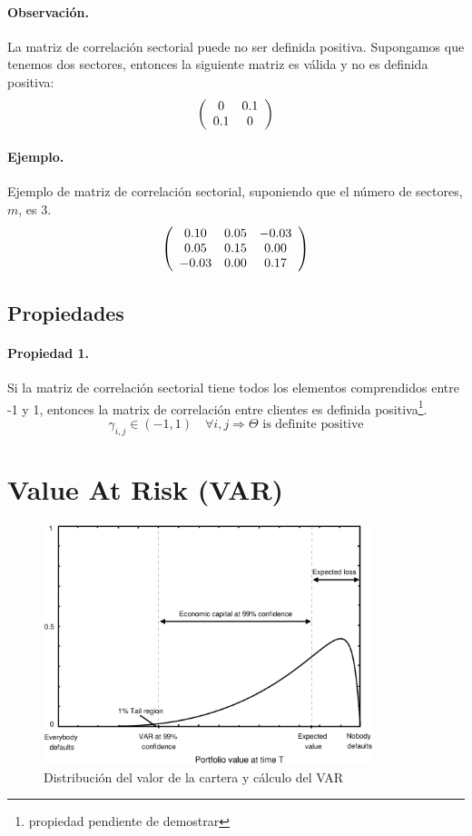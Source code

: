 \paragraph{Observaci\'on.} La matriz de correlaci\'on sectorial puede no ser 
definida positiva. Supongamos que tenemos dos sectores, entonces la siguiente 
matriz es v\'alida y no es definida positiva:
\begin{displaymath}
\left(
\begin{array}{cc}
0 & 0.1 \cr
0.1 & 0
\end{array}
\right)
\end{displaymath}

\paragraph{Ejemplo.} Ejemplo de matriz de correlaci\'on sectorial, suponiendo 
que el n\'umero de sectores, $m$, es 3.
\begin{displaymath}
\left(
\begin{array}{ccc}
 0.10 &  0.05 & -0.03 \cr
 0.05 &  0.15 &  0.00 \cr
-0.03 &  0.00 &  0.17
\end{array}
\right)
\end{displaymath}

\subsection{Propiedades} 

\paragraph{Propiedad 1.} Si la matriz de correlaci\'on sectorial tiene 
todos los elementos comprendidos entre -1 y 1, entonces la matrix de correlaci\'on 
entre clientes es definida positiva\footnote{propiedad pendiente de demostrar}.
\begin{displaymath}
\gamma_{i,j} \in (-1,1) \quad \forall i, j 
\Longrightarrow
\Theta \textrm{ is definite positive}
\end{displaymath}


\section{Value At Risk (VAR)}

\begin{figure}[!hb]
\begin{center}
\includegraphics[height=7cm, angle=0]{./images/creditvar.eps}
\caption{Distribuci\'on del valor de la cartera y c\'alculo del VAR}
\label{creditvar}
\end{center}
\end{figure}
